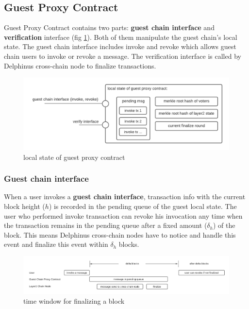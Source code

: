 \documentclass[pageno]{jpaper}
\begin{document}
\subsection{Guest Proxy Contract}
Guest Proxy Contract contains two parts: {\bf guest chain interface} and {\bf verification} interface (fig \ref{local-state}). Both of them manipulate the guest chain's local state. The guest chain interface includes invoke and revoke which allows guest chain users to invoke or revoke a message. The verification interface is called by Delphinus cross-chain node to finalize transactions.

\begin{figure}[!ht]
\includegraphics[scale=0.15]{proxy-local-state.png}
\caption{local state of guest proxy contract}
\label{local-state}
\end{figure}

\subsubsection{Guest chain interface}
When a user invokes a {\bf guest chain interface}, transaction info with the current block height ($h$) is recorded in the pending queue of the guest local state. The user who performed invoke transaction can revoke his invocation any time when the transaction remains in the pending queue after a fixed amount ($\delta_h$) of the block. This means Delphinus cross-chain nodes have to notice and handle this event and finalize this event within $\delta_h$ blocks.

\begin{figure}[!ht]
\includegraphics[scale=0.125]{whole-process}
\caption{time window for finalizing a block}
\label{case-study}
\end{figure}
\end{document}
